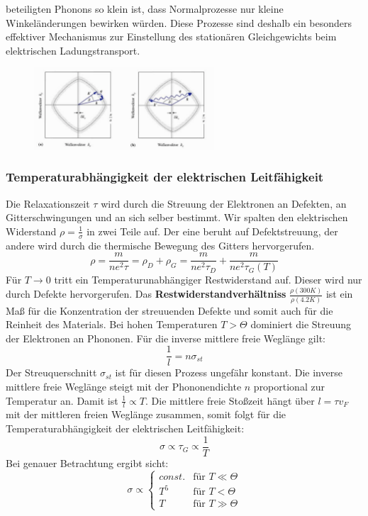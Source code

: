 \documentclass[11pt]{article}
\begin{document}
beteiligten Phonons so klein ist, dass Normalprozesse nur kleine
Winkeländerungen bewirken würden. Diese Prozesse sind deshalb ein besonders
effektiver Mechanismus zur Einstellung des stationären Gleichgewichts beim
elektrischen Ladungstransport.
\begin{figure}[h]
\includegraphics[width=0.6\textwidth]{streuung}
\centering
\label{fig:streuung}
\end{figure}
\subsubsection{Temperaturabhängigkeit der elektrischen Leitfähigkeit}
Die Relaxationszeit $\tau$ wird durch die Streuung der Elektronen an Defekten,
an Gitterschwingungen und an sich selber bestimmt. Wir spalten den elektrischen
Widerstand $\rho=\frac{1}{\sigma}$ in zwei Teile auf. Der eine beruht auf
Defektstreuung, der andere wird durch die thermische Bewegung des Gitters
hervorgerufen.
\begin{equation}
  \rho=\frac{m}{ne^2\tau}=\rho_D+\rho_G=\frac{m}{ne^2\tau_D}+
  \frac{m}{ne^2\tau_G(T)}
\end{equation}
Für $T\to 0$ tritt ein Temperaturunabhängiger Restwiderstand auf. Dieser wird
nur durch Defekte hervorgerufen. Das \textbf{Restwiderstandverhältniss}
$\frac{\rho(300K)}{\rho(4.2K)}$ ist ein Maß für die Konzentration der
streuuenden Defekte und somit auch für die Reinheit des Materials. Bei hohen
Temperaturen $T>\Theta$ dominiert die Streuung der Elektronen an Phononen. Für
die inverse mittlere freie Weglänge gilt:
\begin{equation}
  \frac{1}{l}=n\sigma_{st}
\end{equation}
Der Streuquerschnitt $\sigma_{st}$ ist für diesen Prozess ungefähr konstant. Die
inverse mittlere freie Weglänge steigt mit der Phononendichte $n$ proportional
zur Temperatur an. Damit ist $\frac{1}{l}\propto T$. Die mittlere freie Stoßzeit
hängt über $l=\tau v_F$ mit der mittleren freien Weglänge zusammen, somit folgt
für die Temperaturabhängigkeit der elektrischen Leitfähigkeit:
\begin{equation}
  \sigma\propto\tau_G\propto\frac{1}{T}
\end{equation}
Bei genauer Betrachtung ergibt sicht:
\begin{equation}
  \sigma\propto\begin{cases}
  const. & \text{für } T\ll\Theta \\
  T^5 & \text{für } T<\Theta \\
  T & \text{für } T\gg\Theta
  \end{cases}
\end{equation}
\end{document}
